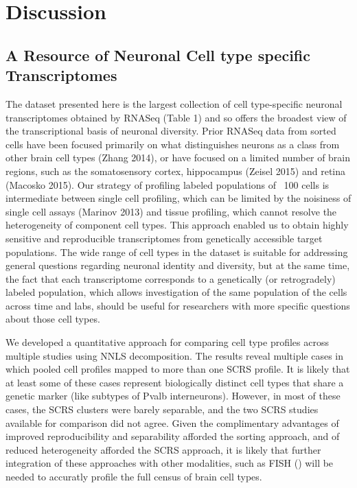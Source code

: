 
\section{Discussion}

\subsection{A Resource of Neuronal Cell type specific Transcriptomes}
The dataset presented here is the largest collection of cell type-specific neuronal transcriptomes obtained by RNASeq (Table 1) and so offers the broadest view of the transcriptional basis of neuronal diversity. Prior RNASeq data from sorted cells have been focused primarily on what distinguishes neurons as a class from other brain cell types (Zhang 2014), or have focused on a limited number of brain regions, such as the somatosensory cortex, hippocampus (Zeisel 2015) and retina (Macosko 2015). Our strategy of profiling labeled populations of ~100 cells is intermediate between single cell profiling, which can be limited by the noisiness of single cell assays (Marinov 2013) and tissue profiling, which cannot resolve the heterogeneity of component cell types. This approach enabled us to obtain highly sensitive and reproducible transcriptomes from genetically accessible target populations. The wide range of cell types in the dataset is suitable for addressing general questions regarding neuronal identity and diversity, but at the same time, the fact that each transcriptome corresponds to a genetically (or retrogradely) labeled population, which allows investigation of the same population of the cells across time and labs, should be useful for researchers with more specific questions about those cell types.

We developed a quantitative approach for comparing cell type profiles across multiple studies using NNLS decomposition. The results reveal multiple cases in which pooled cell profiles mapped to more than one SCRS profile. It is likely that at least some of these cases represent biologically distinct cell types that share a genetic marker (like subtypes of Pvalb interneurons). However, in most of these cases, the SCRS clusters were barely separable, and the two SCRS studies available for comparison did not agree. Given the complimentary advantages of improved reproducibility and separability afforded the sorting approach, and of reduced heterogeneity afforded the SCRS approach, it is likely that further integration of these approaches with other modalities, such as FISH () will be needed to accuratly profile the full census of brain cell types. 

